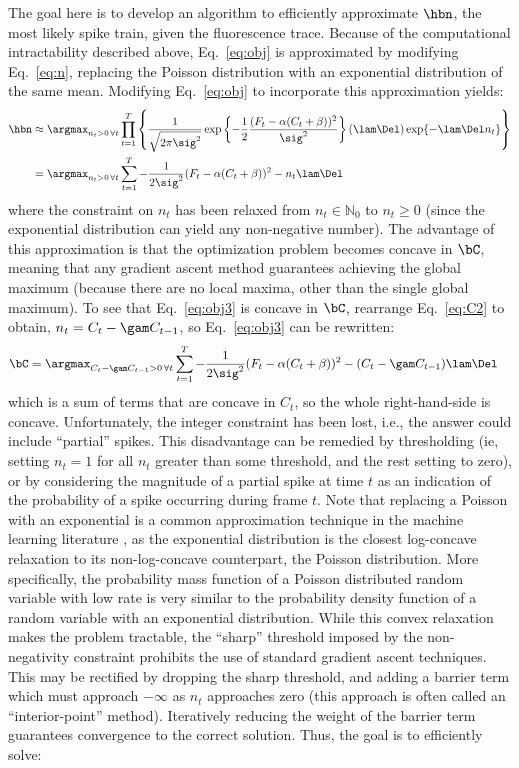 The goal here is to develop an algorithm to efficiently approximate $\hbn$, the most likely spike train, given the fluorescence trace. Because of the computational intractability described above, Eq.~\eqref{eq:obj} is approximated by modifying Eq.~\eqref{eq:n}, replacing the Poisson distribution with an exponential distribution of the same mean. Modifying Eq.~\eqref{eq:obj} to incorporate this approximation yields:
\begin{subequations}
\begin{align} \label{eq:obj2}
\hbn &\approx \argmax_{n_t>0 \, \forall t} \prod_{t=1}^T  \left\{\frac{1}{\sqrt{2 \pi \sig^2}} \exp \left\{-\frac{1}{2}\frac{(F_t - \alpha (C_t + \beta))^2}{\sig^2}\right\}  (\lam\Del) \exp\{-\lam\Del n_t\}\right\}
\\ &= \argmax_{n_t>0 \, \forall t}  \sum_{t=1}^T -\frac{1}{2 \sig^2}(F_t - \alpha(C_t + \beta))^2  - n_t \lam \Del  \label{eq:obj3}
\end{align}
\end{subequations}
where the constraint on $n_t$ has been relaxed from  $n_t \in \mathbb{N}_0$ to $n_t \geq 0$ (since the exponential distribution can yield any non-negative number).  The advantage of this approximation is that the optimization problem becomes concave in $\bC$, meaning that any gradient ascent method guarantees achieving the global maximum (because there are no local maxima, other than the single global maximum).  To see that Eq.~\eqref{eq:obj3} is concave in $\bC$, rearrange Eq.~\eqref{eq:C2} to obtain, $n_t=C_t-\gam C_{t-1}$, so Eq.~\eqref{eq:obj3} can be rewritten:
\begin{align}
\bC &= \argmax_{C_t-\gam C_{t-1}>0 \, \forall t}  \sum_{t=1}^T -\frac{1}{2 \sig^2}(F_t - \alpha(C_t + \beta))^2  - (C_t -\gam C_{t-1}) \lam \Del  \label{eq:obj4}
\end{align}
\noindent which is a sum of terms that are concave in $C_t$, so the whole right-hand-side is concave. Unfortunately, the integer constraint has been lost, i.e.,  the answer could include ``partial'' spikes.  This disadvantage can be remedied by thresholding (ie, setting $n_t=1$ for all $n_t$ greater than some threshold, and the rest setting to zero), or by considering the magnitude of a partial spike at time $t$ as an indication of the probability of a spike occurring during frame $t$. Note that replacing a Poisson with an exponential is a common approximation technique in the machine learning literature \cite{CONV04, PaninskiWu09}, as the exponential distribution is the closest log-concave relaxation to its non-log-concave counterpart, the Poisson distribution. More specifically, the probability mass function of a Poisson distributed random variable with low rate is very similar to the probability density function of a random variable with an exponential distribution. While this convex relaxation makes the problem tractable, the ``sharp'' threshold imposed by the non-negativity constraint prohibits the use of standard gradient ascent techniques. This may be rectified by dropping the sharp threshold, and adding a barrier term which must approach $-\infty$ as $n_t$ approaches zero (this approach is often called an ``interior-point'' method). Iteratively reducing the weight of the barrier term guarantees convergence to the correct solution.  Thus, the goal is to efficiently solve:
